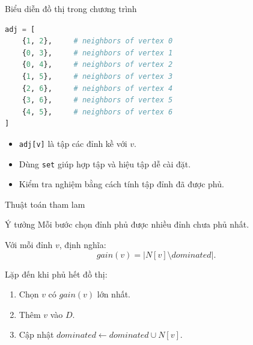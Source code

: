 \documentclass[aspectratio=169, 11pt]{beamer}
\begin{document}
\begin{frame}[fragile]{Biểu diễn đồ thị trong chương trình}
  \begin{lstlisting}[language=Python]
adj = [
    {1, 2},     # neighbors of vertex 0
    {0, 3},     # neighbors of vertex 1
    {0, 4},     # neighbors of vertex 2
    {1, 5},     # neighbors of vertex 3
    {2, 6},     # neighbors of vertex 4
    {3, 6},     # neighbors of vertex 5
    {4, 5},     # neighbors of vertex 6
]
  \end{lstlisting}

  \begin{itemize}
    \item \texttt{adj[v]} là tập các đỉnh kề với $v$.
    \item Dùng \texttt{set} giúp hợp tập và hiệu tập dễ cài đặt.
    \item Kiểm tra nghiệm bằng cách tính tập đỉnh đã được phủ.
  \end{itemize}
\end{frame}
\begin{frame}{Thuật toán tham lam}
  \begin{block}{Ý tưởng}
    Mỗi bước chọn đỉnh phủ được nhiều đỉnh chưa phủ nhất.
  \end{block}

  Với mỗi đỉnh $v$, định nghĩa:
  \[
    gain(v)=|N[v]\setminus dominated|.
  \]

  Lặp đến khi phủ hết đồ thị:
  \begin{enumerate}
    \item Chọn $v$ có $gain(v)$ lớn nhất.
    \item Thêm $v$ vào $D$.
    \item Cập nhật $dominated \gets dominated \cup N[v]$.
  \end{enumerate}
\end{frame}
\end{document}
